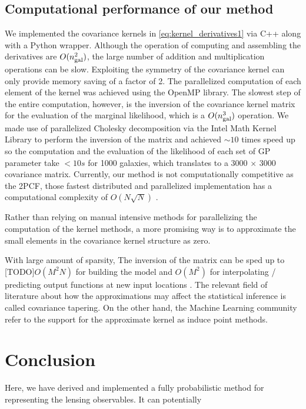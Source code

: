 \subsection{Computational performance of our method}
We implemented the covariance kernels in \ref{eq:kernel_derivatives1}
via {\sc C++} along with a {\sc Python} wrapper. 
Although the operation of computing and assembling the
derivatives are $O(n_{\rm gal}^2)$, the large number of addition and 
multiplication operations can be slow.
Exploiting the symmetry of the covariance kernel can only provide 
memory saving of a factor of 2.
The parallelized computation of each element of the kernel was achieved using 
the {\sc OpenMP} library. The slowest step of the entire computation, however, 
is the inversion of the
covariance kernel matrix for the evaluation of the marginal likelihood, 
which is a $O(n_{\rm gal}^3)$ operation. 
We made use of parallelized Cholesky decomposition via the {\sc Intel Math
Kernel Library}
to perform the inversion of the matrix and achieved $\sim10$ times speed up so the
computation and the evaluation of the likelihood of each set of GP parameter
take $< 10s$ for 1000 galaxies, which translates to a 3000 $\times$ 3000
covariance matrix.
Currently, our method is not computationally competitive as the 2PCF, those
fastest distributed and parallelized 
implementation has a computational complexity of $O(N\sqrt{N})$ \citep{Chhugani2012}.

Rather than relying on manual intensive methods for parallelizing the
computation of the kernel methods, a more promising way is to approximate the
small elements in the covariance kernel structure as zero. 


With large amount of
sparsity, The inversion of the matrix can be sped up to [TODO]$O(M^2N)$ for
building the model and $O(M^2)$ for interpolating / predicting output functions
at new input locations \citep{Snelson2006}.
The relevant field of literature about how the approximations may affect the
statistical inference is called covariance tapering. On the other hand,  
the Machine Learning community refer to the support for the approximate kernel
as induce point methods.

  

\section{Conclusion}
Here, we have derived and implemented a fully probabilistic method for 
representing the lensing observables. It can potentially  


